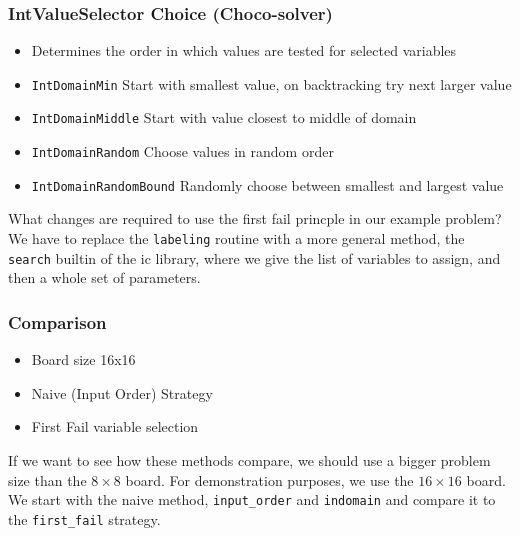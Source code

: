 \begin{frame}
\frametitle{IntValueSelector Choice (Choco-solver)}
\begin{itemize}
\item Determines the order in which values are tested for selected variables
\item \texttt{IntDomainMin} Start with smallest value, on backtracking try next larger value
\item \texttt{IntDomainMiddle} Start with value closest to middle of domain
\item \texttt{IntDomainRandom} Choose values in random order
\item \texttt{IntDomainRandomBound} Randomly choose between smallest and largest value
\end{itemize}
  \hyperlink{nqueens:continue mod}{}
\end{frame}



What changes are required to use the first fail princple in our example problem? We have to replace the \texttt{labeling} routine with a more general method, the \texttt{search} builtin of the ic library, where we give the list of variables to assign, and then a whole set of parameters.

 

\begin{frame}
\frametitle{Comparison}
\label{nqueens:continue mod}
\begin{itemize}
\item Board size 16x16
\item Naive (Input Order) Strategy
\item First Fail variable selection
\end{itemize}
\end{frame}

If we want to see how these methods compare, we should use a bigger problem size than the $8\times 8$ board. For demonstration purposes, we use the $16\times 16$ board. We start with the naive method, \texttt{input\_order} and \texttt{indomain} and compare it to the \texttt{first\_fail} strategy.

